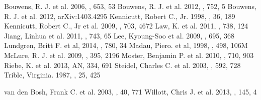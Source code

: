 \begin{thebibliography}{}
 Bouwens, R. J. et al. 2006, \apj, 653, 53	
 Bouwens, R. J. et al. 2012, \apj, 752, 5 	
 Bouwens, R. J. et al. 2012, arXiv:1403.4295
 Kennicutt, Robert C., Jr. 1998, \araa, 
36, 189		%
 Kennicutt, Robert C., Jr et al. 2009, \apj, 
703, 4672	%
 Law, K. et al. 2011, \apj, 738, 124
 Jiang, Linhua et al. 2011, \apj, 743, 65
 Lee, Kyoung-Soo et al. 2009, \apj, 695, 368
 Lundgren, Britt F. et al, 2014, \apj, 780,
34		%
 Madau, Piero. et al, 1998, \apj, 498, 106M
 McLure, R. J. et al. 2009, \mnras, 395, 2196	
 Moster, Benjamin P. et al. 2010, \apj, 710, 
903 
 Riebe, K. et al. 2013, AN, 334, 691 		
 Steidel, Charles C. et al. 2003, \apj, 592, 
728 		%
 Trible, Virginia. 1987, \araa, 25, 425

 van den Bosh, Frank C. et al. 2003, \mnras,
40, 771		%
 Willott, Chris J. et al. 2013, \aj, 145, 4	
\end{thebibliography}
